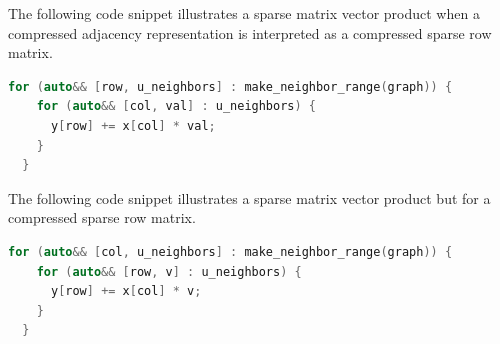 The following code snippet illustrates a sparse matrix vector product when a compressed adjacency representation is interpreted as a compressed sparse row matrix.
\begin{lstlisting}[language=C++]
  for (auto&& [row, u_neighbors] : make_neighbor_range(graph)) {
    for (auto&& [col, val] : u_neighbors) {
      y[row] += x[col] * val;
    }
  }
\end{lstlisting}

The following code snippet illustrates a sparse matrix vector product but for a compressed sparse row matrix.
\begin{lstlisting}[language=C++]
  for (auto&& [col, u_neighbors] : make_neighbor_range(graph)) {
    for (auto&& [row, v] : u_neighbors) {
      y[row] += x[col] * v;
    }
  }
\end{lstlisting}
